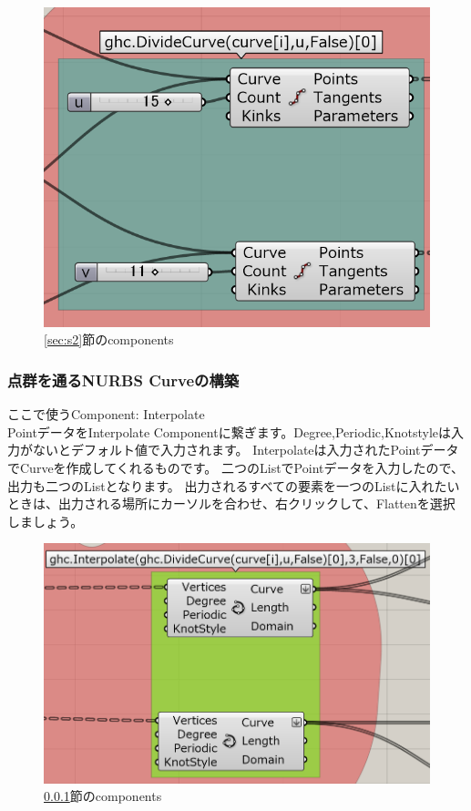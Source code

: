 \documentclass[11pt]{jarticle}
\begin{document}
\label{sec:s2}
\begin{figure}[H]
  \centering
    \includegraphics[width=0.7\linewidth]{fig/p2_1.png}
    \caption{\ref{sec:s2}節のcomponents}
    \label{fig:components2}
\end{figure}

\subsubsection{点群を通るNURBS Curveの構築}
\label{sec:s3}
ここで使うComponent: Interpolate\\
PointデータをInterpolate Componentに繋ぎます。Degree,Periodic,Knotstyleは入力がないとデフォルト値で入力されます。
Interpolateは入力されたPointデータでCurveを作成してくれるものです。
二つのListでPointデータを入力したので、出力も二つのListとなります。
出力されるすべての要素を一つのListに入れたいときは、出力される場所にカーソルを合わせ、右クリックして、Flattenを選択しましょう。

\begin{figure}[H]
  \centering
    \includegraphics[width=0.7\linewidth]{fig/p2_2.png}
    \caption{\ref{sec:s3}節のcomponents}
    \label{fig:components3}
\end{figure}
\end{document}
